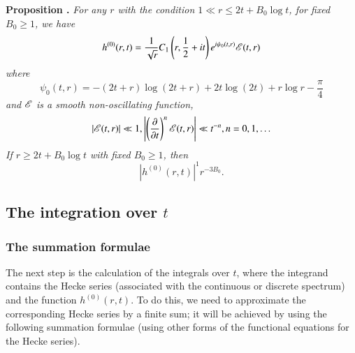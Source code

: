 \medskip
\noindent
{\bfseries Proposition .\label{art7-prop12}}
\textit{For any $r$ with the condition $1 \ll r \leqslant 2t  + B_0 \log t$, for fixed $B_0 \geqslant 1$, we have}
\begin{equation}
h^{(0)} (r,t) = \frac{1}{\sqrt{r}} C_1 \left(r, \frac{1}{2} + it \right) e^{i\psi_0 (t,r)} \mathscr{E} (t, r) \label{art7-eq7.53}
\end{equation}
\textit{where}
\begin{equation}
\psi_0 (t,r) = - (2t +r) \log (2t+r) + 2t \log (2t) + r \log r -\frac{\pi}{4} \label{art7-eq7.54}
\end{equation}\pageoriginale
\textit{and $\mathscr{E}$ is a smooth non-oscillating function,}
\begin{equation}
|\mathscr{E} (t,r )| \ll 1, \left|\left(\frac{\partial}{\partial t} \right)^n \mathscr{E} (t, r) \right| \ll t^{-n}, n = 0, 1, \ldots \label{art7-eq7.55}
\end{equation}
\textit{If $r \geqslant 2t + B_0 \log t$ with fixed $B_0 \geqslant 1$, then}
\begin{equation}
|h^{(0)} (r,t)|^1 r^{-3B_0}. \label{art7-eq7.56}
\end{equation}

\setcounter{section}{2}
\subsection{The integration over $t$}\label{art7-sec2.7}
\subsubsection{The summation formulae}\label{art7-subsubsec2.7.1}

The next step is the calculation of the integrals over $t$, where the integrand contains the Hecke series (associated with the continuous or discrete spectrum) and the function $h^{(0)} (r,t)$. To do this, we need to approximate the corresponding Hecke series by a finite sum; it will be achieved by using the following summation formulae (using other forms of the functional equations for the Hecke series).

